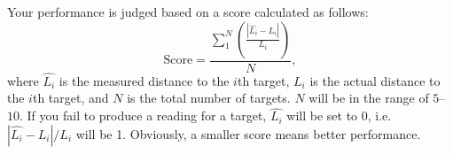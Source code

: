 \documentclass[letterpaper, 11pt]{article}
\begin{document}
Your performance is judged based on a score calculated as follows:
\[
\text{Score} = \frac{\sum_1^N \left( \frac{ \left| \hat{L_i} - L_i \right|}{L_i} \right)}{N},
\]
where $\hat{L_i}$ is the measured distance to the $i$th target, $L_i$ is the actual distance to the $i$th target, and $N$ is the total number of targets. $N$ will be in the range of $5$--$10$. If you fail to produce a reading for a target, $\hat{L_i}$ will be set to 0, i.e.~$\left| \hat{L_i} - L_i \right|/L_i$ will be 1. Obviously, a smaller score means better performance. 

%	
%
\end{document}
